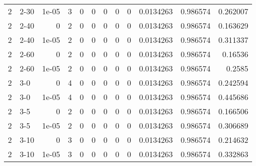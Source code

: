 \begin{tabular}{rlrrrrrrrrrr}
     2 & 2-30   &      1e-05 &           3 &                 0 &                 0 &     0           &     0           &      0           &        0.0134263 &               0.986574 &           0.262007 \\
     2 & 2-40   &      0     &           2 &                 0 &                 0 &     0           &     0           &      0           &        0.0134263 &               0.986574 &           0.163629 \\
     2 & 2-40   &      1e-05 &           2 &                 0 &                 0 &     0           &     0           &      0           &        0.0134263 &               0.986574 &           0.311337 \\
     2 & 2-60   &      0     &           2 &                 0 &                 0 &     0           &     0           &      0           &        0.0134263 &               0.986574 &           0.16536  \\
     2 & 2-60   &      1e-05 &           2 &                 0 &                 0 &     0           &     0           &      0           &        0.0134263 &               0.986574 &           0.2585   \\
     2 & 3-0    &      0     &           4 &                 0 &                 0 &     0           &     0           &      0           &        0.0134263 &               0.986574 &           0.242594 \\
     2 & 3-0    &      1e-05 &           4 &                 0 &                 0 &     0           &     0           &      0           &        0.0134263 &               0.986574 &           0.445686 \\
     2 & 3-5    &      0     &           2 &                 0 &                 0 &     0           &     0           &      0           &        0.0134263 &               0.986574 &           0.166506 \\
     2 & 3-5    &      1e-05 &           2 &                 0 &                 0 &     0           &     0           &      0           &        0.0134263 &               0.986574 &           0.306689 \\
     2 & 3-10   &      0     &           3 &                 0 &                 0 &     0           &     0           &      0           &        0.0134263 &               0.986574 &           0.214632 \\
     2 & 3-10   &      1e-05 &           3 &                 0 &                 0 &     0           &     0           &      0           &        0.0134263 &               0.986574 &           0.332863 \\

\end{tabular}
